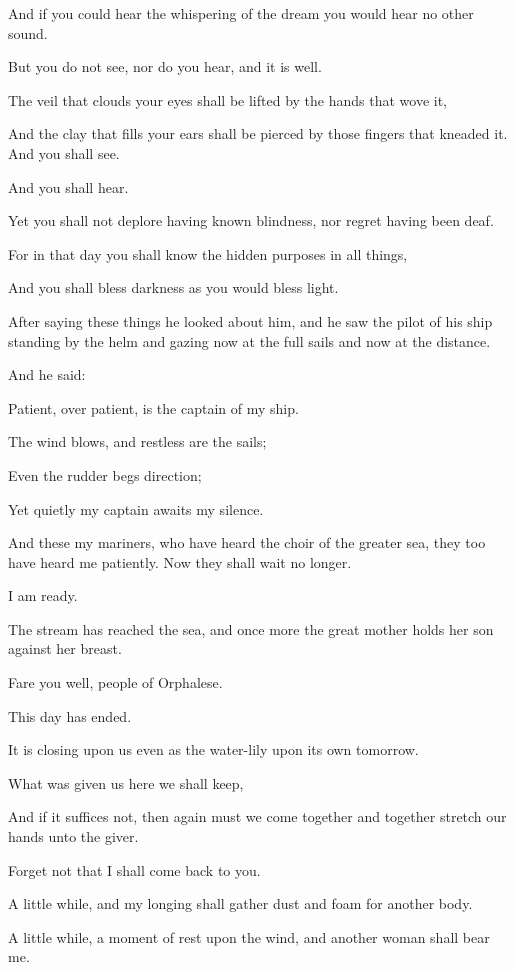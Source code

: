 And if you could hear the whispering of
the dream you would hear no other sound.

But you do not see, nor do you hear, and
it is well.

The veil that clouds your eyes shall be
lifted by the hands that wove it,

And the clay that fills your ears shall
be pierced by those fingers that kneaded
it. And you shall see.

And you shall hear.

Yet you shall not deplore having known
blindness, nor regret having been deaf.

For in that day you shall know the
hidden purposes in all things,

And you shall bless darkness as you
would bless light.

After saying these things he looked
about him, and he saw the pilot of his
ship standing by the helm and gazing
now at the full sails and now at the
distance.

And he said:

Patient, over patient, is the captain of
my ship.

The wind blows, and restless are the
sails;

Even the rudder begs direction;

Yet quietly my captain awaits my
silence.

And these my mariners, who have heard
the choir of the greater sea, they too
have heard me patiently. Now they
shall wait no longer.

I am ready.

The stream has reached the sea, and
once more the great mother holds her son
against her breast.



Fare you well, people of Orphalese.

This day has ended.

It is closing upon us even as the
water-lily upon its own tomorrow.

What was given us here we shall keep,

And if it suffices not, then again must
we come together and together stretch
our hands unto the giver.

Forget not that I shall come back to
you.

A little while, and my longing shall
gather dust and foam for another body.

A little while, a moment of rest upon
the wind, and another woman shall bear
me.

